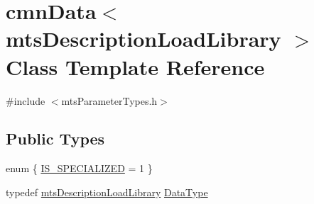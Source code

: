\hypertarget{classcmn_data_3_01mts_description_load_library_01_4}{\section{cmn\-Data$<$ mts\-Description\-Load\-Library $>$ Class Template Reference}
\label{classcmn_data_3_01mts_description_load_library_01_4}
}


{\ttfamily \#include $<$mts\-Parameter\-Types.\-h$>$}

\subsection*{Public Types}
\begin{DoxyCompactItemize}
\item 
enum \{ \hyperlink{classcmn_data_3_01mts_description_load_library_01_4_a78f5329545bd217f5017664b6e63a491acfe38b1285f5f20f7d6c9bbf8fa376fe}{I\-S\-\_\-\-S\-P\-E\-C\-I\-A\-L\-I\-Z\-E\-D} = 1
 \}
\item 
typedef \hyperlink{classmts_description_load_library}{mts\-Description\-Load\-Library} \hyperlink{classcmn_data_3_01mts_description_load_library_01_4_a185937b284886b8335946dd8e0591d0a}{Data\-Type}
\end{DoxyCompactItemize}
